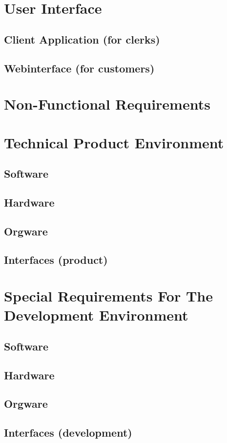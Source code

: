 \documentclass[11pt,a4paper,oneside,svgnames,draft]{report}
\begin{document}
\chapter{User Interface}
\section{Client Application (for clerks)}
\section{Webinterface (for customers)}

\chapter{Non-Functional Requirements}
\chapter{Technical Product Environment}
\section{Software}
\section{Hardware}
\section{Orgware}
\section{Interfaces (product)}

\chapter{Special Requirements For The Development Environment}
\section{Software}
\section{Hardware}
\section{Orgware}
\section{Interfaces (development)}
\end{document}
